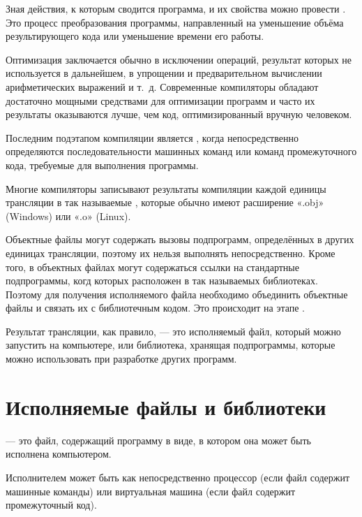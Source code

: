 Зная действия, к которым сводится программа, и их свойства можно
провести . Это процесс преобразования
программы, направленный на уменьшение объёма результирующего кода или
уменьшение времени его работы.

Оптимизация заключается обычно в исключении операций, результат
которых не используется в дальнейшем, в упрощении и предварительном
вычислении арифметических выражений и т.~д. Современные компиляторы
обладают достаточно мощными средствами для оптимизации программ и
часто их результаты оказываются лучше, чем код, оптимизированный
вручную человеком.

Последним подэтапом компиляции является , когда непосредственно определяются
последовательности машинных команд или команд промежуточного кода,
требуемые для выполнения программы.

Многие компиляторы записывают результаты компиляции каждой единицы
трансляции в так называемые ,
которые обычно имеют расширение «.obj» (Windows) или «.o» (Linux).

Объектные файлы могут содержать вызовы подпрограмм, определённых в
других единицах трансляции, поэтому их нельзя выполнять
непосредственно.  Кроме того, в объектных файлах могут содержаться
ссылки на стандартные подпрограммы, когд которых расположен в так
называемых библиотеках.  Поэтому для получения исполняемого файла
необходимо объединить объектные файлы и связать их с библиотечным
кодом. Это происходит на этапе .

Результат трансляции, как правило, — это исполняемый файл, который
можно запустить на компьютере, или библиотека, хранящая подпрограммы,
которые можно использовать при разработке других программ.

\section{Исполняемые файлы и библиотеки}

\begin{defn}
   — это файл, содержащий
  программу в виде, в котором она может быть исполнена компьютером.
\end{defn}

Исполнителем может быть как непосредственно процессор (если файл
содержит машинные команды) или виртуальная машина (если файл содержит
промежуточный код).

